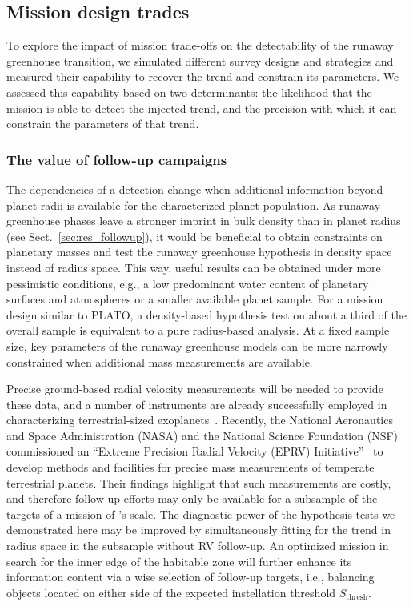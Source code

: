 \documentclass[twocolumn,twocolappendix]{aastex631}
\begin{document}
\subsection{Mission design trades}\label{sec:mission-design-trades}
To explore the impact of mission trade-offs on the detectability of the runaway greenhouse transition, we simulated different survey designs and strategies and measured their capability to recover the trend and constrain its parameters.
We assessed this capability based on two determinants: the likelihood that the mission is able to detect the injected trend, and the precision with which it can constrain the parameters of that trend.

\subsubsection{The value of follow-up campaigns}
The dependencies of a detection change when additional information beyond planet radii is available for the characterized planet population.
As runaway greenhouse phases leave a stronger imprint in bulk density than in planet radius (see Sect.~\ref{sec:res_followup}), it would be beneficial to obtain constraints on planetary masses and test the runaway greenhouse hypothesis in density space instead of radius space.
This way, useful results can be obtained under more pessimistic conditions, e.g., a low predominant water content of planetary surfaces and atmospheres or a smaller available planet sample.
For a mission design similar to PLATO, a density-based hypothesis test on about a third of the overall sample is equivalent to a pure radius-based analysis.
At a fixed sample size, key parameters of the runaway greenhouse models can be more narrowly constrained when additional mass measurements are available.

Precise ground-based radial velocity measurements will be needed to provide these data, and a number of instruments are already successfully employed in characterizing terrestrial-sized exoplanets~\citep[e.g.,][]{Queloz2001a,Pepe2010,Johnson2010b,Ribas2023}.
Recently, the National Aeronautics and Space Administration (NASA) and the National Science Foundation (NSF) commissioned an ``Extreme Precision Radial Velocity (EPRV) Initiative''~\citep{Crass2021} to develop methods and facilities for precise mass measurements of temperate terrestrial planets.
Their findings highlight that such measurements are costly, and therefore follow-up efforts may only be available for a subsample of the targets of a mission of \plato's scale.
The diagnostic power of the hypothesis tests we demonstrated here may be improved by simultaneously fitting for the trend in radius space in the subsample without RV follow-up.
An optimized mission in search for the inner edge of the habitable zone will further enhance its information content via a wise selection of follow-up targets, i.e., balancing objects located on either side of the expected instellation threshold $S_\mathrm{thresh}$.
\end{document}
